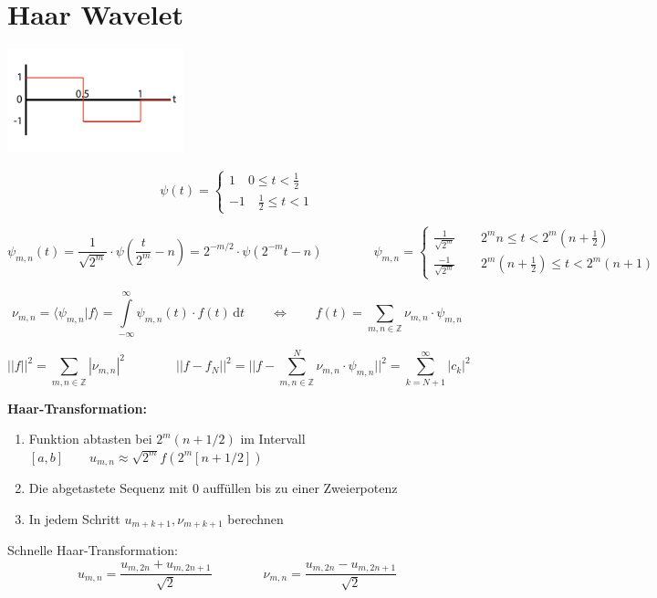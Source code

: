 \section{Haar Wavelet}

\begin{center}
	\begin{minipage}[c]{0.3\textwidth}
		\includegraphics[height=3cm]{content/HaarWavelet.pdf}
	\end{minipage}	
	\begin{minipage}[c]{0.3\textwidth}
		\[
			\psi(t)=\begin{cases} 1 \quad 0 \leq t < \frac{1}{2}\\ -1 \quad \frac{1}{2} \leq t < 1  \end{cases}  
		\]
	\end{minipage}
\end{center}


\[  
	\psi_{m,n}(t)=\frac{1}{\sqrt{2^m}} \cdot \psi(\frac{t}{2^m} - n) = 2^{-m/2} \cdot \psi(2^{-m}t-n) 
	\qquad \qquad
	\psi_{m,n}  = \begin{cases} 
	\frac{1}{\sqrt{2^m}} \qquad 2^m n \leq t < 2^m(n+\frac{1}{2}) \\ 
	\frac{-1}{\sqrt{2^m}} \qquad 2^m(n+\frac{1}{2}) \leq t < 2^m(n+1)
	\end{cases}
\]

\[ 
	\nu_{m,n} = \langle \psi_{m,n} | f \rangle = \int\limits_{-\infty}^{\infty}\psi_{m,n}(t) \cdot f(t) \,\mathrm{d}t
	\qquad \Longleftrightarrow \qquad
	f(t)=\sum_{m,n \in \mathbb{Z}} \nu_{m,n} \cdot \psi_{m,n}
\]
	
\[  
	||f||^2 = \sum_{m,n \in \mathbb{Z}} |\nu_{m,n}|^2 \qquad \qquad ||f-f_N||^2 = ||f - \sum_{m,n \in \mathbb{Z}}^N \nu_{m,n} \cdot \psi_{m,n}||^2 = \sum_{k=N+1}^{\infty} |c_k|^2
\]

\textbf{Haar-Transformation:}
\begin{enumerate}
	\item Funktion abtasten bei $2^m(n+1/2)$ im Intervall $[a,b] \qquad u_{m,n}\approx \sqrt{2^m}f(2^m[n+1/2])$ 
	\item Die abgetastete Sequenz mit 0 auffüllen bis zu einer Zweierpotenz
	\item In jedem Schritt $u_{m+k+1}, \nu_{m+k+1}$ berechnen
\end{enumerate}

Schnelle Haar-Transformation:
\[  
	u_{m,n} = \dfrac{u_{m,2n}+u_{m,2n+1}}{\sqrt{2}} 
	\qquad \qquad
	\nu_{m,n} = \dfrac{u_{m,2n}-u_{m,2n+1}}{\sqrt{2}}
\]
